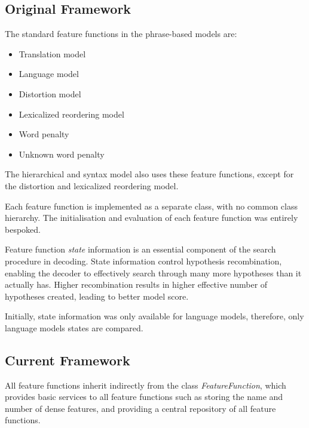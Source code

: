 \documentclass{pbml}
\begin{document}
\subsection{Original Framework}

The standard feature functions in the phrase-based models are:
\begin{itemize}
  \item Translation model
  \item Language model
  \item Distortion model
  \item Lexicalized reordering model
  \item Word penalty
  \item Unknown word penalty
\end{itemize}
The hierarchical and syntax model also uses these feature functions, except for the distortion and lexicalized reordering model.

Each feature function is implemented as a separate class, with no common class hierarchy. The initialisation and evaluation of each feature function was entirely bespoked.

Feature function \emph{state} information is an essential component of the search procedure in decoding. State information control hypothesis recombination, enabling the decoder to effectively search through many more hypotheses than it actually has. Higher recombination results in higher effective number of hypotheses created, leading to better model score.

Initially, state information was only available for language models, therefore, only language models states are compared.

%        

\subsection{Current Framework}        
 All feature functions inherit indirectly from the class \emph{FeatureFunction}, which provides basic services to all feature functions such as storing the name and number of dense features, and providing a central repository of all feature functions.
\end{document}
